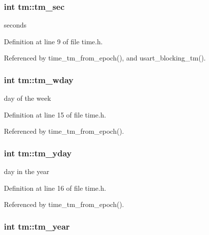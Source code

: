\hypertarget{structtm_a4d098a9a5c03a00b2ee61e10851de81e}{}
\subsubsection[{tm\+\_\+sec}]{\setlength{\rightskip}{0pt plus 5cm}int tm\+::tm\+\_\+sec}\label{structtm_a4d098a9a5c03a00b2ee61e10851de81e}


seconds 



Definition at line 9 of file time.\+h.



Referenced by time\+\_\+tm\+\_\+from\+\_\+epoch(), and usart\+\_\+blocking\+\_\+tm().

\hypertarget{structtm_afe81a8c46f1c693c43f259b288859f4f}{}
\subsubsection[{tm\+\_\+wday}]{\setlength{\rightskip}{0pt plus 5cm}int tm\+::tm\+\_\+wday}\label{structtm_afe81a8c46f1c693c43f259b288859f4f}


day of the week 



Definition at line 15 of file time.\+h.



Referenced by time\+\_\+tm\+\_\+from\+\_\+epoch().

\hypertarget{structtm_a93a0ba77cc23796df84405dcbcc57eb1}{}
\subsubsection[{tm\+\_\+yday}]{\setlength{\rightskip}{0pt plus 5cm}int tm\+::tm\+\_\+yday}\label{structtm_a93a0ba77cc23796df84405dcbcc57eb1}


day in the year 



Definition at line 16 of file time.\+h.



Referenced by time\+\_\+tm\+\_\+from\+\_\+epoch().

\hypertarget{structtm_a33adf78fd6476b2120ce3b9c4a852053}{}
\subsubsection[{tm\+\_\+year}]{\setlength{\rightskip}{0pt plus 5cm}int tm\+::tm\+\_\+year}\label{structtm_a33adf78fd6476b2120ce3b9c4a852053}


